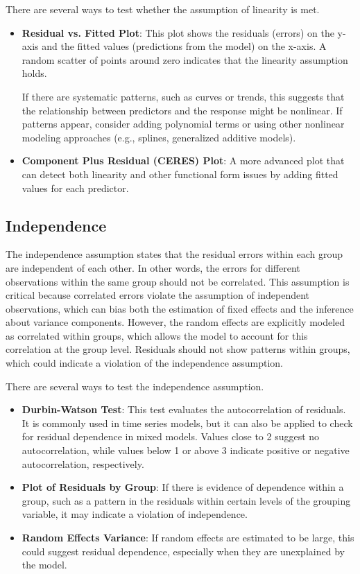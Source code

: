 There are several ways to test whether the assumption of linearity is met. 
\begin{itemize}
\item \textbf{Residual vs. Fitted Plot}: This plot shows the residuals (errors) on the y-axis and the fitted values (predictions from the model) on the x-axis. A random scatter of points around zero indicates that the linearity assumption holds.

If there are systematic patterns, such as curves or trends, this suggests that the relationship between predictors and the response might be nonlinear. If patterns appear, consider adding polynomial terms or using other nonlinear modeling approaches (e.g., splines, generalized additive models).

\item \textbf{Component Plus Residual (CERES) Plot}:  A more advanced plot that can detect both linearity and other functional form issues by adding fitted values for each predictor.
\end{itemize}

\subsection*{Independence}
The independence assumption states that the residual errors within each group are independent of each other. In other words, the errors for different observations within the same group should not be correlated. This assumption is critical because correlated errors violate the assumption of independent observations, which can bias both the estimation of fixed effects and the inference about variance components. However, the random effects are explicitly modeled as correlated within groups, which allows the model to account for this correlation at the group level. Residuals should not show patterns within groups, which could indicate a violation of the independence assumption.

There are several ways to test the independence assumption.
\begin{itemize}
\item \textbf{Durbin-Watson Test}: This test evaluates the autocorrelation of residuals. It is commonly used in time series models, but it can also be applied to check for residual dependence in mixed models. Values close to 2 suggest no autocorrelation, while values below 1 or above 3 indicate positive or negative autocorrelation, respectively.

\item \textbf{Plot of Residuals by Group}: If there is evidence of dependence within a group, such as a pattern in the residuals within certain levels of the grouping variable, it may indicate a violation of independence.

\item \textbf{Random Effects Variance}: If random effects are estimated to be large, this could suggest residual dependence, especially when they are unexplained by the model.
\end{itemize}

